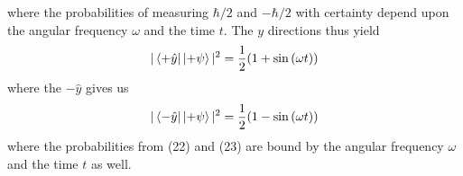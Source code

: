 \documentclass[twocolumn]{article}
\begin{document}
where the probabilities of measuring $\hbar/2$ and $-\hbar/2$ with certainty depend upon the angular frequency $\omega$ and the time $t$. The $y$ directions thus yield
\begin{equation}
|\bra{+\hat{y}}\ket{+\psi}|^2=\frac{1}{2}(1+\sin{(\omega t)})
\end{equation}
where the $-\hat{y}$ gives us
\begin{equation}
|\bra{-\hat{y}}\ket{+\psi}|^2=\frac{1}{2}(1-\sin{(\omega t)})\end{equation}
where the probabilities from (22) and (23) are bound by the angular frequency $\omega$ and the time $t$ as well.
\end{document}
